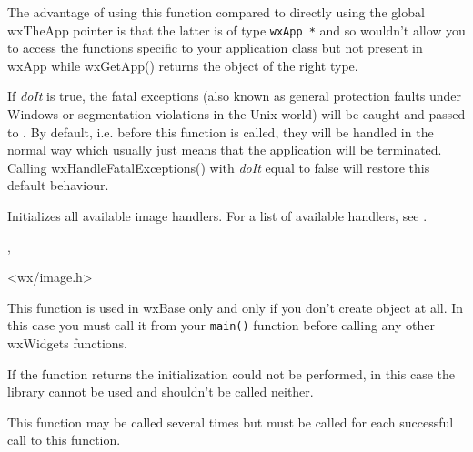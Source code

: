 The advantage of using this function compared to directly using the global
wxTheApp pointer is that the latter is of type {\tt wxApp *} and so wouldn't
allow you to access the functions specific to your application class but not
present in wxApp while wxGetApp() returns the object of the right type.


\label{wxhandlefatalexceptions}


If {\it doIt} is true, the fatal exceptions (also known as general protection
faults under Windows or segmentation violations in the Unix world) will be
caught and passed to .
By default, i.e. before this function is called, they will be handled in the
normal way which usually just means that the application will be terminated.
Calling wxHandleFatalExceptions() with {\it doIt} equal to false will restore
this default behaviour.


\label{wxinitallimagehandlers}


Initializes all available image handlers. For a list of available handlers,
see .


, 


<wx/image.h>


\label{wxinitialize}


This function is used in wxBase only and only if you don't create
 object at all. In this case you must call it from your
{\tt main()} function before calling any other wxWidgets functions.

If the function returns \false the initialization could not be performed,
in this case the library cannot be used and
 shouldn't be called neither.

This function may be called several times but
 must be called for each successful
call to this function.


